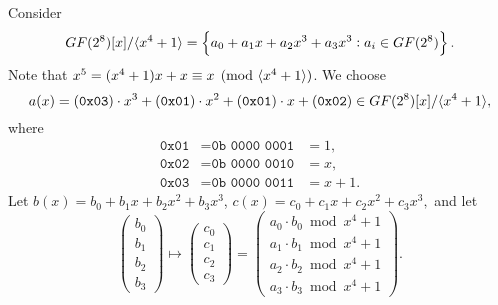 \newpage
\noindent Consider
\[
GF(2^8)[x]/\langle x^4+1 \rangle=\set{a_0+a_1x+a_2x^3+a_3x^3: a_i\in GF(2^8)}.
\] Note that $x^5=(x^4+1)x+x\equiv x\pmod{\langle x^4+1 \rangle}$.
We choose \[
a(x)=(\texttt{0x03})\cdot x^3 + (\texttt{0x01})\cdot x^2 + (\texttt{0x01})\cdot x + (\texttt{0x02})\in GF(2^8)[x]/\langle x^4+1 \rangle,
\] where \begin{align*}
	\texttt{0x01} &=\texttt{0b\ 0000\ 0001} &= 1,\\
	\texttt{0x02} &=\texttt{0b\ 0000\ 0010} &= x,\\
	\texttt{0x03} &=\texttt{0b\ 0000\ 0011} &= x+1.
\end{align*}
Let $b(x) = b_0 + b_1x + b_2x^2 + b_3x^3$, $c(x) = c_0 + c_1x + c_2x^2 + c_3x^3,$ and let
\[
\begin{pmatrix}
	b_0 \\ b_1 \\ b_2 \\ b_3
\end{pmatrix}{\mapsto}
\begin{pmatrix}
	c_0 \\ c_1 \\ c_2 \\ c_3
\end{pmatrix}=
\begin{pmatrix}
	a_0\cdot b_0\bmod x^4+1 \\
	a_1\cdot b_1\bmod x^4+1 \\
	a_2\cdot b_2\bmod x^4+1 \\
	a_3\cdot b_3\bmod x^4+1
\end{pmatrix}.
\]
